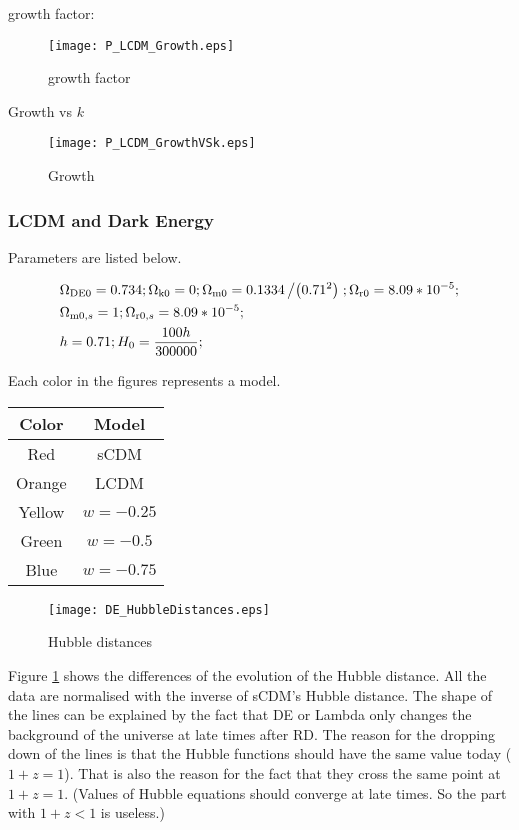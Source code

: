 \documentclass{article}
\begin{document}
growth factor:
\begin{figure}[!htbp]
\centering
\texttt{[image: P\_LCDM\_Growth.eps]}
\caption{growth factor}
\end{figure}

Growth vs $k$
\begin{figure}[!htbp]
\centering
\texttt{[image: P\_LCDM\_GrowthVSk.eps]}
\caption{Growth}
\end{figure}




\subsubsection{LCDM and Dark Energy}

Parameters are listed below.

\begin{eqnarray}
&\Omega _{\text{DE0}}=0.734;\Omega _{\text{k0}}=0;\Omega _{\text{m0}}=0.1334\left/\left(0.71^2\right)\right.;
\Omega _{\text{r0}}=8.09*10^{-5};
\\
&\Omega _{\text{m0},s}=1;\Omega _{\text{r0},s}=8.09*10^{-5};\\
&h=0.71;H_0=\frac{100 h}{300000};
\end{eqnarray}

Each color in the figures represents a model.
\vspace{2ex}
\begin{center}
\begin{tabular}{|c|c|}\hline
{\bf Color} & {\bf Model} \\\hline
Red & sCDM \\\hline
Orange & LCDM \\\hline
Yellow & $w=-0.25$ \\ \hline
Green &  $w=-0.5$ \\ \hline
Blue & $w=-0.75$ \\ \hline
\end{tabular}
\end{center}
\vspace{2ex}





\begin{figure}[!htbp]
\centering
\texttt{[image: DE\_HubbleDistances.eps]} 
\caption{Hubble distances}\label{fig:DE_HubbleDistances}
\end{figure}


Figure \ref{fig:DE_HubbleDistances} shows the differences of the evolution of the Hubble distance. All the data are normalised with the inverse of sCDM's Hubble distance.
The shape of the lines can be explained by the fact that DE or Lambda only changes the background of the universe at late times after RD. The reason for the dropping down of the lines is that the Hubble functions should have the same value today ($1+z=1$). That is also the reason for the fact that they cross the same point at $1+z=1$. (Values of Hubble equations should converge at late times. So the part with $1+z<1$ is useless.)
\end{document}
